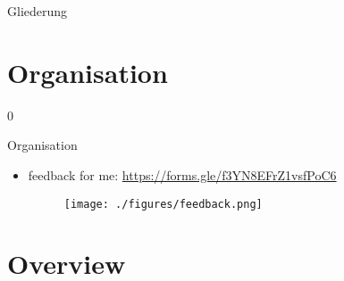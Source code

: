 \def\pascal{0}
\def\preview{1}









\begin{withoutheadline}
  \begin{withoutfootline}
    \begin{frame}
      \titlepagesecond
    \end{frame}
  \end{withoutfootline}

  \begin{frame}[shrink=10]{Gliederung}
    \tableofcontents[hideallsubsections]
  \end{frame}
\end{withoutheadline}

\setcounter{section}{-2}

\section{Organisation}

\if\pascal0{
  \begin{frame}{Organisation}
    \begin{itemize}
      \item \alert{feedback for me:} \url{https://forms.gle/f3YN8EFrZ1vsfPoC6}
      \begin{figure}
        \centering
        \texttt{[image: ./figures/feedback.png]}
      \end{figure}
    \end{itemize}
  \end{frame}
}\fi

\section{Overview}

